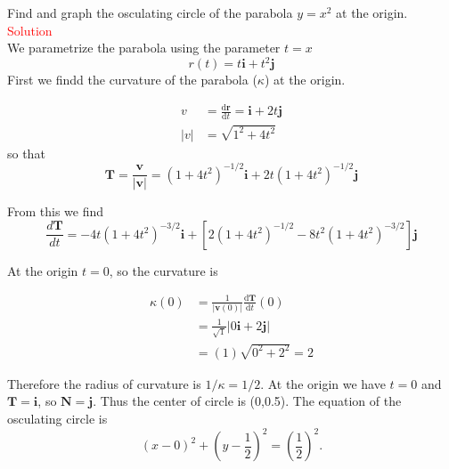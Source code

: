 \documentclass[12pt,a4paper]{article}
\begin{document}
\begin{example}
  Find and graph the osculating circle of the parabola \(y=x^2\) at the origin.
\textcolor{red}{Solution}\\
We parametrize the parabola using the parameter \(t=x\)
\[r(t) = t\mathbf{i} + t^2\mathbf{j} \]
First we findd the curvature of the parabola (\(\kappa\)) at the origin.

\begin{align*}
  v &= \frac{\mathrm{d}\mathbf{r}}{\mathrm{d}t} = \mathbf{i} + 2t\mathbf{j}\\
  |v| &= \sqrt{1^2 + 4t^2}
\end{align*}
so that
\[\mathbf{T}=\frac{\mathbf{v}}{|\mathbf{v}|}=\left(1+4 t^2\right)^{-1 / 2} \mathbf{i}+2 t\left(1+4 t^2\right)^{-1 / 2} \mathbf{j}\]

\noindent From this we find
\[\frac{d \mathbf{T}}{d t}=-4 t\left(1+4 t^2\right)^{-3 / 2} \mathbf{i}+\left[2\left(1+4 t^2\right)^{-1 / 2}-8 t^2\left(1+4 t^2\right)^{-3 / 2}\right] \mathbf{j}\]

\noindent At the origin \(t=0\), so the curvature is

\begin{align*}
  \kappa (0) &= \frac{1}{|\mathbf{v}(0)|} \frac{\mathrm{d}\mathbf{T}}{\mathrm{d}t}(0)\\
  &= \frac{1}{\sqrt{1}}\left|0\mathbf{i}+ 2 \mathbf{j}\right| \\
  &= (1)\sqrt{0^2+2^2} = 2
\end{align*}

\noindent Therefore the radius of curvature is \(1\slash \kappa = 1/2\). At the origin we have \(t=0\) and \(\mathbf{T = i}\), so \(\mathbf{N = j}\). Thus the center of circle is (0,0.5). The equation of the osculating circle is
\[(x-0)^2+\left(y-\frac{1}{2}\right)^2=\left(\frac{1}{2}\right)^2 .\]

\begin{center}
\end{center}
  
\end{example}
\end{document}
